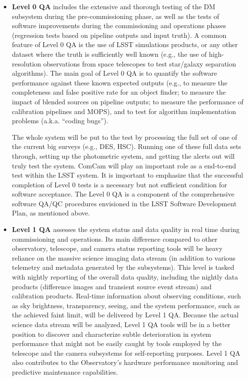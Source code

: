 \documentclass[SE,toc,lsstdraft]{lsstdoc}
\begin{document}
\begin{itemize}
\item {\bf Level 0 QA} includes the extensive and thorough testing of the DM subsystem
during the pre-commissioning phase, as well as the tests of software improvements
during the commissioning and operations phases (regression tests based on pipeline
outputs and input truth). A common feature of Level 0 QA is
the use of LSST simulations products, or any other dataset where the truth is sufficiently
well known (e.g., the use of high-resolution observations from space telescopes to test
star/galaxy separation algorithms). The main goal of Level 0 QA is to quantify the
software performance against these known expected outputs (e.g., to measure the
completeness and false positive rate for an object finder; to measure the impact of
blended sources on pipeline outputs; to measure the performance of calibration pipelines
and MOPS), and to test for algorithm implementation problems (a.k.a. ``coding bugs'').

The whole system will be put to the test by processing the full set of one of the current big surveys (e.g., DES, HSC). Running one of these full data sets through, setting up the photometric system, and getting the alerts out will truly test the system.
ComCam will play an important role as a end-to-end test within the LSST system.
It is important to emphasize that the successful completion of Level 0 tests is a necessary
but not sufficient condition for software acceptance. The Level 0 QA is a component of the comprehensive software QA/QC procedures envisioned in the LSST Software Development Plan, as mentioned above.

\item {\bf Level 1 QA} assesses the system status and data quality in real time during
commissioning and operations. Its
main difference compared to other observatory, telescope, and camera status reporting
tools will be heavy reliance on the massive science imaging data stream (in addition to various
telemetry and metadata generated by the subsystems). This level is tasked
with nightly reporting of the overall data quality, including the nightly data products
(difference images and transient source event stream) and calibration products.
Real-time information about observing conditions, such as sky brightness,
transparency, seeing, and the system performance, such as the achieved faint limit, will be delivered
by Level 1 QA. Because the actual science data stream will be analyzed, Level 1 QA tools will be
in a better position to discover and characterize subtle deterioration in system performance
that might not be easily caught by tools employed by the telescope
and the camera subsystems for self-reporting purposes. Level 1 QA also contributes to the Observatory's hardware performance monitoring and predictive maintenance capabilities.


\end{itemize}
\end{document}
